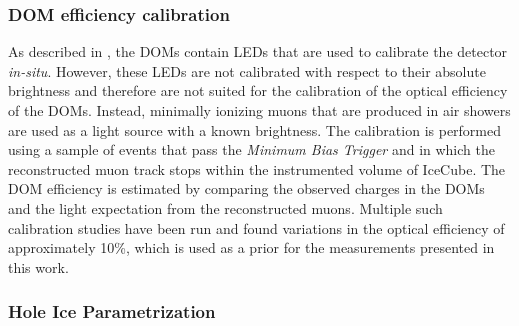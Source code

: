 \subsubsection{DOM efficiency calibration}
\label{sec:domeff-calibration}
As described in , the DOMs contain LEDs that are used to calibrate the detector \emph{in-situ}. However, these LEDs are not calibrated with respect to their absolute brightness and therefore are not suited for the calibration of the optical efficiency of the DOMs. Instead, minimally ionizing muons that are produced in air showers are used as a light source with a known brightness. The calibration is performed using a sample of events that pass the \emph{Minimum Bias Trigger}\cite{icecube_detector_17} and in which the reconstructed muon track stops within the instrumented volume of IceCube. The DOM efficiency is estimated by comparing the observed charges in the DOMs and the light expectation from the reconstructed muons. Multiple such calibration studies have been run  and found variations in the optical efficiency of approximately 10\%, which is used as a prior for the measurements presented in this work.

\subsubsection{Hole Ice Parametrization}
\label{sec:hole-ice-parametrization}

